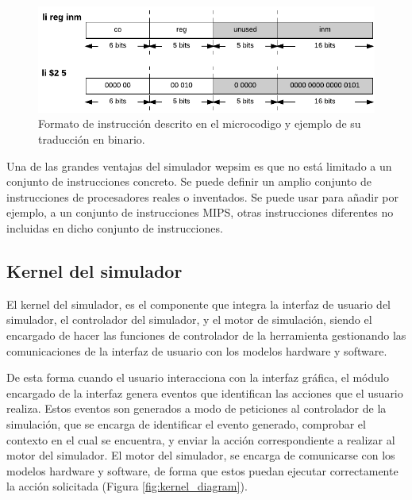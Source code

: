 \begin{figure}[htbp]
 	\centering
 	\includegraphics[width=14cm]{figures/instruction_example_traduction}
 	\caption{Formato de instrucción descrito en el \gls{microcodigo} y ejemplo de su traducción en binario.}
	\label{fig:software_assembly_traduction}
\end{figure}

Una de las grandes ventajas del simulador \acrshort{wepsim} es que no está limitado a un conjunto de instrucciones concreto. Se puede definir un amplio conjunto de instrucciones de procesadores reales o inventados. Se puede usar para añadir por ejemplo, a un conjunto de instrucciones MIPS, otras instrucciones diferentes no incluidas en dicho conjunto de instrucciones.

\subsection{Kernel del simulador}
\label{sec:kernel_simulator}

El kernel del simulador, es el componente que integra la interfaz de usuario del simulador, el controlador del simulador, y el motor de simulación, siendo el encargado de hacer las funciones de controlador de la herramienta gestionando las comunicaciones de la interfaz de usuario con los modelos \gls{hardware} y \gls{software}. 

De esta forma cuando el usuario interacciona con la interfaz gráfica, el módulo encargado de la interfaz genera eventos que identifican las acciones que el usuario realiza. Estos eventos son generados a modo de peticiones al controlador de la simulación, que se encarga de identificar el evento generado, comprobar el contexto en el cual se encuentra, y enviar la acción correspondiente a realizar al motor del simulador. El motor del simulador, se encarga de comunicarse con los modelos \gls{hardware} y \gls{software}, de forma que estos puedan ejecutar correctamente la acción solicitada (Figura \ref{fig:kernel_diagram}).


